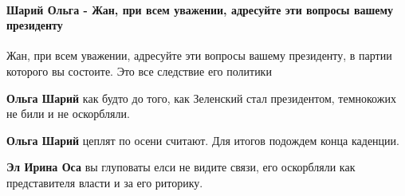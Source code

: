  
 
 
 
 
\paragraph{Шарий Ольга - Жан, при всем уважении, адресуйте эти вопросы вашему президенту}

\begin{itemize}
 

Жан, при всем уважении, адресуйте эти вопросы вашему президенту, в партии
которого вы состоите. Это все следствие его политики

\begin{itemize}
 
\textbf{Ольга Шарий} как будто до того, как Зеленский стал президентом, темнокожих не били и не оскорбляли.

 
\textbf{Ольга Шарий} цеплят по осени считают. Для итогов подождем конца каденции.

 
\textbf{Эл Ирина Оса} вы глуповаты елси не видите связи, его оскорбляли как представителя власти и за его риторику.


\end{itemize}
\end{itemize}

